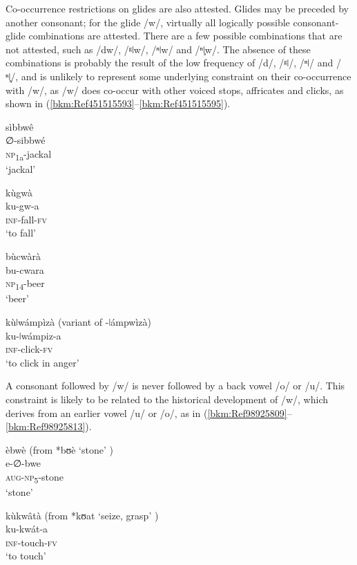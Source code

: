 Co-occurrence restrictions on glides are also attested. Glides may be preceded by another conso\-nant; for the glide /w/, virtually all logically possible consonant-glide combinations are at\-tested. There are a few possible combinations that are not attested, such as /dw/, /ᵍǀw/, /ⁿǀw/ and /ⁿ{ǀ}̥w/. The absence of these combinations is probably the result of the low frequency of /d/, /ᵍǀ/, /ⁿǀ/ and /ⁿ{ǀ}̥/, and is unlikely to represent some underlying constraint on their co-occurrence with /w/, as /w/ does co-occur with other voiced stops, affricates and clicks, as shown in (\ref{bkm:Ref451515593}--\ref{bkm:Ref451515595}).

\ea
\label{bkm:Ref451515593}
\glll sìbbwê\\
∅-sibbwé\\
\textsc{np}\textsubscript{1a}-jackal\\
\glt ‘jackal’
\z

\ea
\glll kùgwà\\
ku-gw-a\\
\textsc{inf}-fall-\textsc{fv}\\
\glt ‘to fall’
\z

\ea
\glll bùcwàrà\\
bu-cwara\\
\textsc{np}\textsubscript{14}-beer\\
\glt ‘beer’
\z

\ea
\label{bkm:Ref451515595}
kùǀwámpìzà (variant of -ǀámpwìzà)\\
ku-ǀwámpiz-a\\
\textsc{inf}-click-\textsc{fv}\\
\glt ‘to click in anger’
\z

A consonant followed by /w/ is never followed by a back vowel /o/ or /u/. This constraint is likely to be related to the historical development of /w/, which derives from an earlier vowel /u/ or /o/, as in (\ref{bkm:Ref98925809}--\ref{bkm:Ref98925813}).

\ea
\label{bkm:Ref98925809}
èbwè (from *bʊè ‘stone’ \citep{BastinEtAl2002})\\
e-∅-bwe\\
\textsc{aug}-\textsc{np}\textsubscript{5}-stone\\
\glt ‘stone’
\z

\ea
kùkwâtà (from *kʊat ‘seize, grasp’ \citep{BastinEtAl2002})\\
ku-kwát-a\\
\textsc{inf}-touch-\textsc{fv}\\
\glt ‘to touch’
\z

